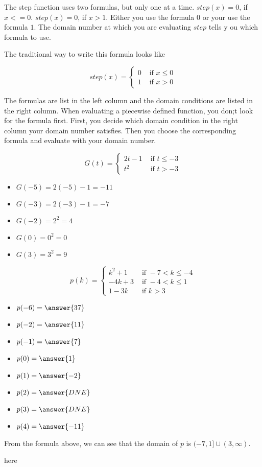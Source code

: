 \documentclass{ximera}
\begin{document}
The step function uses two formulas, but only one at a time.  $step(x) = 0$, if $x <= 0$. $step(x) = 0$, if $x > 1$.  Either you use the formula $0$ or your use the formula $1$.  The domain number at which you are evaluating $step$ tells y ou which formula to use.


The traditional way to write this formula looks like

\[
step(x) = 
\begin{cases}
  0 & \text{ if } x \leq 0 \\
  1 & \text{ if } x > 0
\end{cases}
\]

The formulas are list in the left column and the domain conditions are listed in the right column.  When evaluating a piecewise defined function, you don;t look for the formula first.  First, you decide which domain condition in the right column your domain number satisfies.  Then you choose the corresponding formula and evaluate with your domain number.



\begin{example}

\[
G(t) = 
\begin{cases}
  2t-1 & \text{ if } t \leq -3 \\
  t^2 & \text{ if } t > -3
\end{cases}
\]


\begin{itemize}
\item $G(-5) = 2(-5) - 1 = -11$  
\item $G(-3) = 2(-3) - 1 = -7$ 
\item $G(-2) = 2^2 = 4$ 
\item $G(0) = 0^2 = 0$ 
\item $G(3) = 3^2 = 9$ 
\end{itemize}

\end{example}




\begin{question}

\[
p(k) = 
\begin{cases}
  k^2 + 1 & \text{ if } -7 < k \leq -4 \\
  -4k + 3 & \text{ if } -4 < k \leq 1 \\
  1 - 3k & \text{ if } k > 3
\end{cases}
\]


\begin{itemize}
\item $p(-6) = \answer{37}$  
\item $p(-2) = \answer{11}$ 
\item $p(-1) = \answer{7}$ 
\item $p(0) = \answer{1}$ 
\item $p(1) = \answer{-2}$ 
\item $p(2) = \answer{DNE}$ 
\item $p(3) = \answer{DNE}$ 
\item $p(4) = \answer{-11}$ 
\end{itemize}

\end{question}



From the formula above, we can see that the domain of $p$ is $(-7, 1] \cup (3, \infty)$.



here
\end{document}
